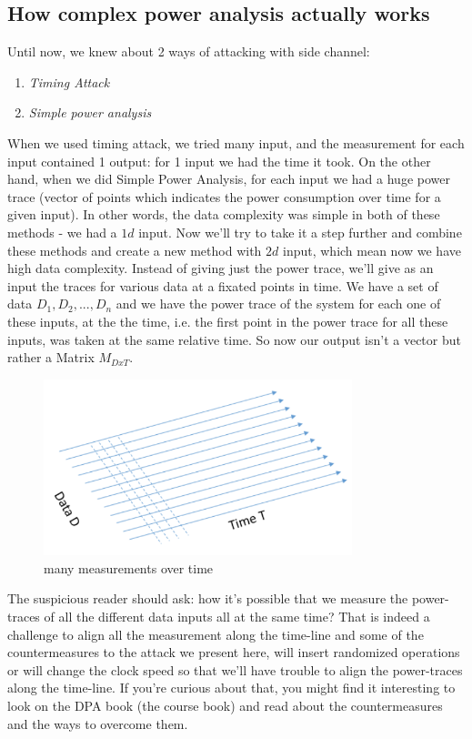 \subsection{How complex power analysis actually works}
Until now, we knew about 2 ways of attacking with side channel:
\begin{enumerate}
\item \textit{Timing Attack}
\item \textit{Simple power analysis}
\end{enumerate}
When we used timing attack, we tried many input, and the measurement for each input contained 1 output: for 1 input we had the time it took.
On the other hand, when we did Simple Power Analysis, for each input we had a huge power trace (vector of points which indicates the power consumption over time for a given input).
In other words, the data complexity was simple in both of these methods - we had a \(1d\) input.
Now we'll try to take it a step further and combine these methods and create a new method with \(2d\) input, which mean now we have high data complexity.
Instead of giving just the power trace, we'll give as an input the traces for various data at a fixated points in time. We have a set of data \({D_1, D_2, ..., D_n}\) and we have the power trace of the system for each one of these inputs, at the the time, i.e. the first point in the power trace for all these inputs, was taken at the same relative time.
So now our output isn't a vector but rather a Matrix \(M_{DxT}\).
\begin{figure}[H]
\centering
\includegraphics[width=0.8\textwidth]{images/Lecture6/DPA_Illustration.png}
\caption{many measurements over time}
\label{fig:DPA_Illustration}
\end{figure}

The suspicious reader should ask: how it's possible that we measure the power-traces of all the different data inputs all at the same time? That is indeed a challenge to align all the measurement along the time-line and some of the countermeasures to the attack we present here, will insert randomized operations or will change the clock speed so that we'll have trouble to align the power-traces along the time-line. If you're curious about that, you might find it interesting to look on the DPA book (the course book) and read about the countermeasures and the ways to overcome them.
